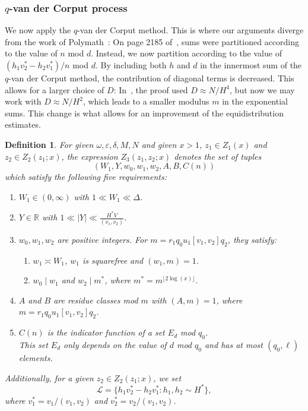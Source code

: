 \documentclass{amsart}
\newtheorem{defn}{Definition}
\numberwithin{equation}{section}
\begin{document}
 


\subsubsection{$q$-van der Corput process}


We now apply the $q$-van der Corput method. This is where our arguments diverge from the work of Polymath~\cite{Polymath:2014:EDZ}: On page 2185 of~\cite{Polymath:2014:EDZ}, sums were partitioned according to the value of $n$ mod $d$. Instead, we now partition according to the value of $(h_1v_2^*-h_2v_1^*)/n$ mod $d$. By including both $h$ and $d$ in the innermost sum of the $q$-van der Corput method, the contribution of diagonal terms is decreased. This allows for a larger choice of $D$: In~\cite{Polymath:2014:EDZ}, the proof used $D \approx N/H^4$, but now we may work with $D \approx N/H^2$, which leads to a smaller modulus $m$ in the exponential sums. This change  is what allows for an improvement of the equidistribution estimates.

\begin{defn}\label{def:Z3}
For given $\omega, \varepsilon, \delta, M, N$ and given $x>1$, $z_1 \in Z_1(x)$ and $z_2 \in Z_2(z_1;x)$, the expression $Z_3(z_1,z_2;x)$ denotes the set of tuples  
$$(W_1,Y, w_0,w_1,w_2,A,B, C(n))$$
which satisfy the following five requirements:
\begin{enumerate}[{\rm (i)}]
\item  $W_1 \in (0,\infty)$ with $1 \ll W_1 \ll \Delta$.
\item $Y \in \mathbb{R}$  with $1 \ll |Y| \ll \frac{H^*V}{(v_1,v_2)}$.
 \item $w_0, w_1, w_2$ are positive integers. For $m = r_1q_0u_1[v_1,v_2]q_2$, they satisfy:
\begin{enumerate}[{\rm (a)}]
\item $w_1 \asymp W_1$, $w_1$ is  squarefree and $(w_1,m)=1$.
\item  $w_0 \mid w_1$ and $w_2 \mid m^*$, where  $ m^*=m^{\lfloor 2\log(x) \rfloor}$.
\end{enumerate} 
\item $A$ and $B$ are residue classes mod $m$ with $(A,m)=1$, where $m = r_1q_0u_1[v_1,v_2]q_2$.
\item $C(n)$ is the indicator function of a set $E_d$ mod $q_0$. \\
This set $E_d$  only depends on  the value of $d$ mod $q_0$ and has at most $(q_0,\ell)$ elements.
\end{enumerate}

\smallskip
Additionally, for a given $z_2 \in Z_2(z_1;x)$, we set 
$$\mathcal{L} = \{h_1 v_2^* - h_2 v_1^*: h_1, h_2 \sim H^*\},$$ where $v_1^*= v_1/(v_1,v_2)$ and $v_2^* = v_2/(v_1,v_2)$.
\end{defn}
\end{document}
